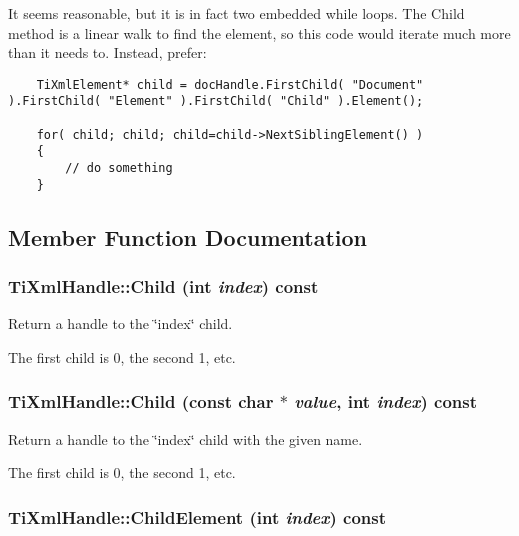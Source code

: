 It seems reasonable, but it is in fact two embedded while loops. The Child method is a linear walk to find the element, so this code would iterate much more than it needs to. Instead, prefer:



\footnotesize\begin{verbatim}
	TiXmlElement* child = docHandle.FirstChild( "Document" ).FirstChild( "Element" ).FirstChild( "Child" ).Element();

	for( child; child; child=child->NextSiblingElement() )
	{
		// do something
	}
	\end{verbatim}
\normalsize




\subsection{Member Function Documentation}
\subsubsection{ Ti\-Xml\-Handle::Child (int {\em index}) const}\label{classTiXmlHandle_TiXmlHandlea8}


Return a handle to the \char`\"{}index\char`\"{} child. 

The first child is 0, the second 1, etc.
\subsubsection{ Ti\-Xml\-Handle::Child (const char $\ast$ {\em value}, int {\em index}) const}\label{classTiXmlHandle_TiXmlHandlea7}


Return a handle to the \char`\"{}index\char`\"{} child with the given name. 

The first child is 0, the second 1, etc.
\subsubsection{ Ti\-Xml\-Handle::Child\-Element (int {\em index}) const}\label{classTiXmlHandle_TiXmlHandlea10}


